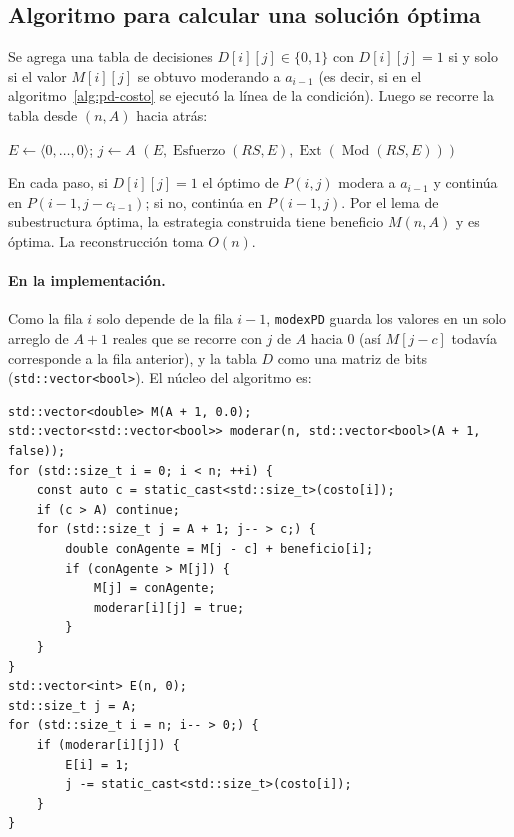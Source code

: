 \documentclass[11pt,letterpaper]{article}
\newcommand{\Ext}{\operatorname{Ext}}
\newcommand{\Esf}{\operatorname{Esfuerzo}}
\newcommand{\Mod}{\operatorname{Mod}}
\begin{document}
\subsection{Algoritmo para calcular una solución óptima}

Se agrega una tabla de decisiones $D[i][j] \in \{0,1\}$ con $D[i][j] = 1$ si
y solo si el valor $M[i][j]$ se obtuvo moderando a $a_{i-1}$ (es decir, si en
el algoritmo~\ref{alg:pd-costo} se ejecutó la línea de la condición). Luego
se recorre la tabla desde $(n, A)$ hacia atrás:

\begin{algorithm}[h]
\caption{Reconstrucción de una estrategia óptima}
$E \gets \langle 0,\dots,0\rangle$; $j \gets A$\;
\Return $(E, \Esf(RS,E), \Ext(\Mod(RS,E)))$\;
\end{algorithm}

En cada paso, si $D[i][j] = 1$ el óptimo de $P(i,j)$ modera a $a_{i-1}$ y
continúa en $P(i-1, j - c_{i-1})$; si no, continúa en $P(i-1, j)$. Por el
lema de subestructura óptima, la estrategia construida tiene beneficio
$M(n,A)$ y es óptima. La reconstrucción toma $O(n)$.

\paragraph{En la implementación.} Como la fila $i$ solo depende de la fila
$i-1$, \texttt{modexPD} guarda los valores en un solo arreglo de $A+1$ reales
que se recorre con $j$ de $A$ hacia $0$ (así $M[j - c]$ todavía corresponde a
la fila anterior), y la tabla $D$ como una matriz de bits
(\texttt{std::vector<bool>}). El núcleo del algoritmo es:

\begin{lstlisting}
std::vector<double> M(A + 1, 0.0);
std::vector<std::vector<bool>> moderar(n, std::vector<bool>(A + 1, false));
for (std::size_t i = 0; i < n; ++i) {
    const auto c = static_cast<std::size_t>(costo[i]);
    if (c > A) continue;
    for (std::size_t j = A + 1; j-- > c;) {
        double conAgente = M[j - c] + beneficio[i];
        if (conAgente > M[j]) {
            M[j] = conAgente;
            moderar[i][j] = true;
        }
    }
}
std::vector<int> E(n, 0);
std::size_t j = A;
for (std::size_t i = n; i-- > 0;) {
    if (moderar[i][j]) {
        E[i] = 1;
        j -= static_cast<std::size_t>(costo[i]);
    }
}
\end{lstlisting}
\end{document}
